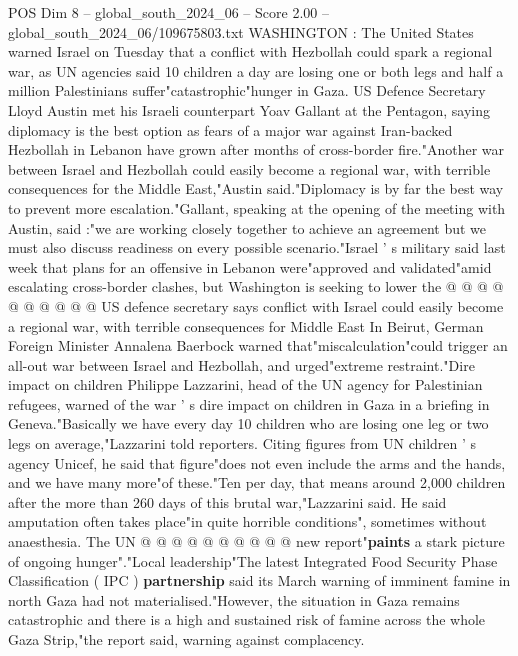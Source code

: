 \begin{textsample}{POS Dim 8 – global\_south\_2024\_06 – Score 2.00 – global\_south\_2024\_06/109675803.txt}  \label{ex:f8_pos_406}
WASHINGTON : The United States warned Israel on Tuesday that a conflict with Hezbollah could spark a regional war, as UN agencies said 10 children a day are losing one or both legs and half a million Palestinians suffer"catastrophic"hunger in Gaza.
US Defence Secretary Lloyd Austin met his Israeli counterpart Yoav Gallant at the Pentagon, saying diplomacy is the best option as fears of a major war against Iran-backed Hezbollah in Lebanon have grown after months of cross-border fire."Another war between Israel and Hezbollah could easily become a regional war, with terrible consequences for the Middle East,"Austin said."Diplomacy is by far the best way to prevent more escalation."Gallant, speaking at the opening of the meeting with Austin, said :"we are working closely together to achieve an agreement but we must also discuss readiness on every possible scenario."Israel ' s military said last week that plans for an offensive in Lebanon were"approved and validated"amid escalating cross-border clashes, but Washington is seeking to lower the @ @ @ @ @ @ @ @ @ @ US defence secretary says conflict with Israel could easily become a regional war, with terrible consequences for Middle East In Beirut, German Foreign Minister Annalena Baerbock warned that"miscalculation"could trigger an all-out war between Israel and Hezbollah, and urged"extreme restraint."Dire impact on children Philippe Lazzarini, head of the UN agency for Palestinian refugees, warned of the war ' s dire impact on children in Gaza in a briefing in Geneva."Basically we have every day 10 children who are losing one leg or two legs on average,"Lazzarini told reporters.
Citing figures from UN children ' s agency Unicef, he said that figure"does not even include the arms and the hands, and we have many more"of these."Ten per day, that means around 2,000 children after the more than 260 days of this brutal war,"Lazzarini said.
He said amputation often takes place"in quite horrible conditions", sometimes without anaesthesia.
The UN @ @ @ @ @ @ @ @ @ @ new report"\textbf{paints} a stark picture of ongoing hunger"."Local leadership"The latest Integrated Food Security Phase Classification ( IPC ) \textbf{partnership} said its March warning of imminent famine in north Gaza had not materialised."However, the situation in Gaza remains catastrophic and there is a high and sustained risk of famine across the whole Gaza Strip,"the report said, warning against complacency.

\end{textsample}
